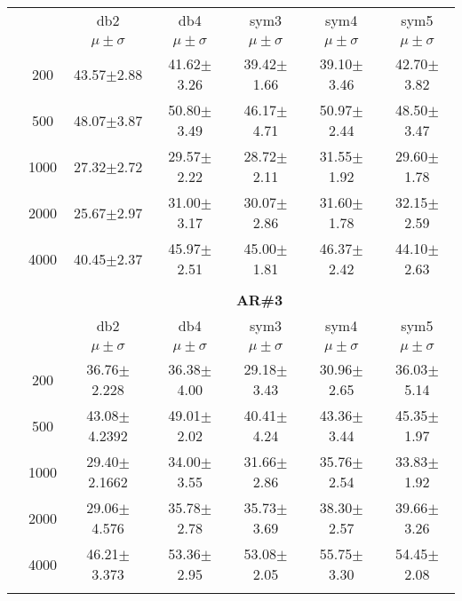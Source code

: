 \begin{table}[H]
\begin{tabular}{|c|c|c c c c c|}
\multicolumn{2}{c|}{}  & db2 & db4 & sym3 & sym4 & sym5 \\\cline{3-7}
\multicolumn{2}{c|}{}& $\mu \pm \sigma$ & $\mu \pm \sigma$ & $\mu \pm \sigma$ & $\mu \pm \sigma$ & $\mu \pm \sigma$ \\\hline


\multicolumn{1}{|c|}{ \multirow{5}{*}{\rotatebox[origin=c]{90}{\textbf{Neurônios}}} }
&200	&43.57$\pm$2.88	&41.62$\pm$3.26	&39.42$\pm$1.66	&39.10$\pm$3.46	&42.70$\pm$3.82	\\\cline{2-7}
&500	&48.07$\pm$3.87	&50.80$\pm$3.49	&46.17$\pm$4.71	&50.97$\pm$2.44	&48.50$\pm$3.47	\\\cline{2-7}
&1000	&27.32$\pm$2.72	&29.57$\pm$2.22	&28.72$\pm$2.11	&31.55$\pm$1.92	&29.60$\pm$1.78	\\\cline{2-7}
&2000	&25.67$\pm$2.97	&31.00$\pm$3.17	&30.07$\pm$2.86	&31.60$\pm$1.78	&32.15$\pm$2.59	\\\cline{2-7}
&4000	&40.45$\pm$2.37	&45.97$\pm$2.51	&45.00$\pm$1.81	&46.37$\pm$2.42	&44.10$\pm$2.63	

\\ \midrule
\multicolumn{7}{c}{}\\ 



\cline{3-7}
\multicolumn{2}{c|}{\multirow{3}{*}{}} & \multicolumn{5}{c|}{\textbf{AR\#3}}   \\\cline{3-7} 

\multicolumn{2}{c|}{}  & db2 & db4 & sym3 & sym4 & sym5 \\\cline{3-7}
\multicolumn{2}{c|}{}& $\mu \pm \sigma$ & $\mu \pm \sigma$ & $\mu \pm \sigma$ & $\mu \pm \sigma$ & $\mu \pm \sigma$ \\\hline

\multicolumn{1}{|c|}{ \multirow{5}{*}{\rotatebox[origin=c]{90}{\textbf{Neurônios}}} }
&200	&36.76$\pm$2.228	&36.38$\pm$4.00	&29.18$\pm$3.43	&30.96$\pm$2.65	&36.03$\pm$5.14	\\\cline{2-7}
&500	&43.08$\pm$4.2392	&49.01$\pm$2.02	&40.41$\pm$4.24	&43.36$\pm$3.44	&45.35$\pm$1.97	\\\cline{2-7}
&1000	&29.40$\pm$2.1662	&34.00$\pm$3.55	&31.66$\pm$2.86	&35.76$\pm$2.54	&33.83$\pm$1.92	\\\cline{2-7}
&2000	&29.06$\pm$4.576	&35.78$\pm$2.78	&35.73$\pm$3.69	&38.30$\pm$2.57	&39.66$\pm$3.26	\\\cline{2-7}
&4000	&46.21$\pm$3.373	&53.36$\pm$2.95	&53.08$\pm$2.05	&55.75$\pm$3.30	&54.45$\pm$2.08	

\\\midrule 
\multicolumn{7}{c}{}\\ 




\end{tabular}
\end{table}

